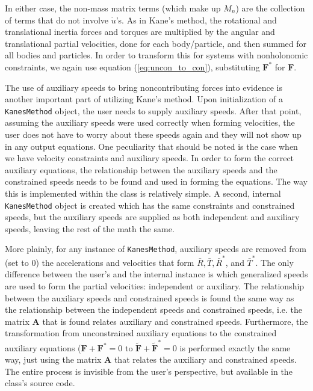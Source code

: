\documentclass[twocolumn,10pt, final]{asme2e}
\begin{document}
In either case, the non-mass matrix terms (which make up $M_n$) are the
collection of terms that do not involve $\dot{u}$'s.
As in Kane's method, the rotational and translational inertia forces and
torques are multiplied by the angular and translational partial velocities,
done for each body/particle, and then summed for all bodies and particles.
In order to transform this for systems with nonholonomic constraints, we again
use equation (\ref{eq:uncon_to_con}), substituting $\mathbf{F}^*$ for
$\mathbf{F}$.

The use of auxiliary speeds to bring noncontributing forces into evidence is
another important part of utilizing Kane's method.
Upon initialization of a \verb|KanesMethod| object, the user needs to supply
auxiliary speeds.
After that point, assuming the auxiliary speeds were used correctly when
forming velocities, the user does not have to worry about these speeds again
and they will not show up in any output equations.
One peculiarity that should be noted is the case when we have velocity
constraints and auxiliary speeds.
In order to form the correct auxiliary equations, the relationship between the
auxiliary speeds and the constrained speeds needs to be found and used in
forming the equations.
The way this is implemented within the class is relatively simple.
A second, internal \verb|KanesMethod| object is created which has the same
constraints and constrained speeds, but the auxiliary speeds are supplied as
both independent and auxiliary speeds, leaving the rest of the math the same.

More plainly, for any instance of \verb|KanesMethod|, auxiliary speeds are
removed from (set to 0) the accelerations and velocities that form
$\bar{R}, \bar{T}, \bar{R}^*$, and $\bar{T}^*$.
The only difference between the user's and the internal instance is which
generalized speeds are used to form the partial velocities: independent or
auxiliary.
The relationship between the auxiliary speeds and constrained speeds is found
the same way as the relationship between the independent speeds and constrained
speeds, i.e. the matrix $\mathbf{A}$ that is found relates auxiliary and
constrained speeds.
Furthermore, the transformation from unconstrained auxiliary equations to the
constrained auxiliary equations ($\mathbf{F} + \mathbf{F}^*=0$ to
$\tilde{\mathbf{F}} + \tilde{\mathbf{F}}^* = 0$ is performed exactly the same
way, just using the matrix $\mathbf{A}$ that relates the auxiliary and
constrained speeds.
The entire process is invisible from the user's perspective, but available in
the class's source code.
\end{document}
